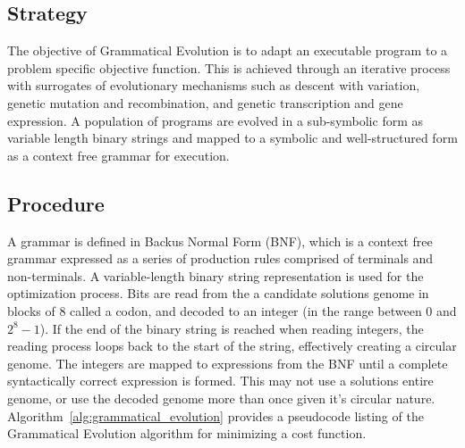 \subsection{Strategy}
The objective of Grammatical Evolution is to adapt an executable program to a problem specific objective function.
This is achieved through an iterative process with surrogates of evolutionary mechanisms such as descent with variation, genetic mutation and recombination, and genetic transcription and gene expression. A population of programs are evolved in a sub-symbolic form as variable length binary strings and mapped to a symbolic and well-structured form as a context free grammar for execution.

\subsection{Procedure}
A grammar is defined in Backus Normal Form (BNF), which is a context free grammar expressed as a series of production rules comprised of terminals and non-terminals.
A variable-length binary string representation is used for the optimization process. Bits are read from the a candidate solutions genome in blocks of 8 called a codon, and decoded to an integer (in the range between 0 and $2^{8}-1$). If the end of the binary string is reached when reading integers, the reading process loops back to the start of the string, effectively creating a circular genome. The integers are mapped to expressions from the BNF until a complete syntactically correct expression is formed. This may not use a solutions entire genome, or use the decoded genome more than once given it's circular nature.
Algorithm~\ref{alg:grammatical_evolution} provides a pseudocode listing of the Grammatical Evolution algorithm for minimizing a cost function.


